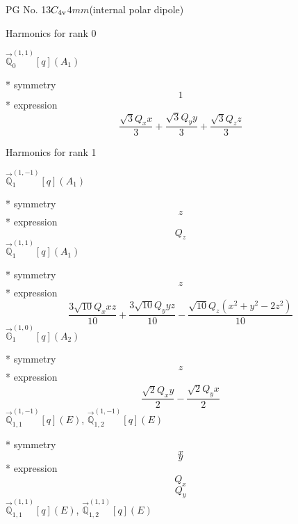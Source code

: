 \documentclass[fleqn,8pt]{jsarticle}
\begin{document}
\setcounter{MaxMatrixCols}{32}

\renewcommand{\tablename}{Table~}
\renewcommand{\figurename}{Figure~}
\begin{center}
\LARGE
PG No. 13\quad$C_{\rm 4v}$\quad$4mm$\quad[ tetragonal ] (internal polar dipole)
\end{center}

\noindent * Harmonics for rank 0

\noindent\quad $\vec{\mathbb{Q}}_{0}^{(1,1)}[q](A_{1})$

\noindent\quad ** symmetry
\begin{dmath*}
1
\end{dmath*}
\noindent\quad ** expression
\begin{dmath*}
\frac{\sqrt{3} Q_{x} x}{3} + \frac{\sqrt{3} Q_{y} y}{3} + \frac{\sqrt{3} Q_{z} z}{3}
\end{dmath*}

\noindent * Harmonics for rank 1

\noindent\quad $\vec{\mathbb{Q}}_{1}^{(1,-1)}[q](A_{1})$

\noindent\quad ** symmetry
\begin{dmath*}
z
\end{dmath*}
\noindent\quad ** expression
\begin{dmath*}
Q_{z}
\end{dmath*}
\noindent\quad $\vec{\mathbb{Q}}_{1}^{(1,1)}[q](A_{1})$

\noindent\quad ** symmetry
\begin{dmath*}
z
\end{dmath*}
\noindent\quad ** expression
\begin{dmath*}
\frac{3 \sqrt{10} Q_{x} x z}{10} + \frac{3 \sqrt{10} Q_{y} y z}{10} - \frac{\sqrt{10} Q_{z} \left(x^{2} + y^{2} - 2 z^{2}\right)}{10}
\end{dmath*}
\noindent\quad $\vec{\mathbb{G}}_{1}^{(1,0)}[q](A_{2})$

\noindent\quad ** symmetry
\begin{dmath*}
z
\end{dmath*}
\noindent\quad ** expression
\begin{dmath*}
\frac{\sqrt{2} Q_{x} y}{2} - \frac{\sqrt{2} Q_{y} x}{2}
\end{dmath*}
\noindent\quad $\vec{\mathbb{Q}}_{1,1}^{(1,-1)}[q](E)$, $\vec{\mathbb{Q}}_{1,2}^{(1,-1)}[q](E)$

\noindent\quad ** symmetry
\begin{dmath*}
x
\end{dmath*}
\begin{dmath*}
y
\end{dmath*}
\noindent\quad ** expression
\begin{dmath*}
Q_{x}
\end{dmath*}
\begin{dmath*}
Q_{y}
\end{dmath*}
\noindent\quad $\vec{\mathbb{Q}}_{1,1}^{(1,1)}[q](E)$, $\vec{\mathbb{Q}}_{1,2}^{(1,1)}[q](E)$
\end{document}

